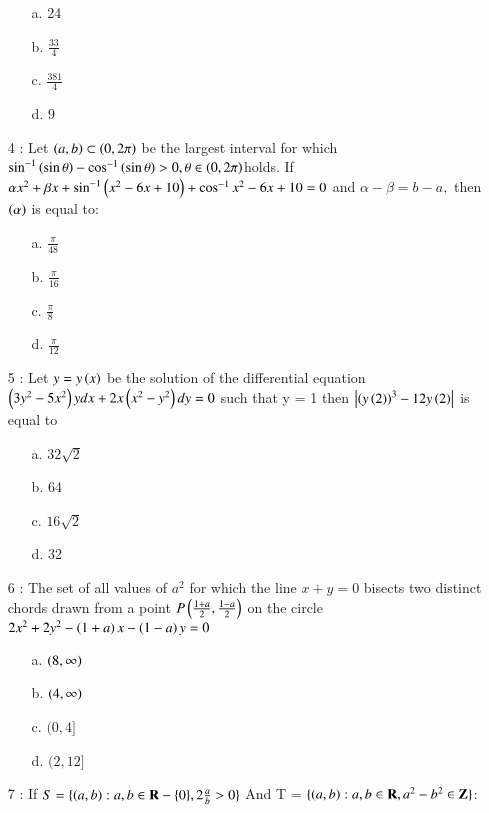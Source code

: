 \documentclass[journal]{IEEEtran}
\begin{document}
\begin{enumerate}
\begin{enumerate}
    \item [a.] 24
    \item [b.] $\frac{33}{4}$
    \item [c.] $\frac{381}{4}$
    \item [d.] 9
\end{enumerate}
\item[4]: Let $\left(a, b\right) \subset \left( 0, 2\pi\right)$ be the largest interval for which$\sin ^{-1}\left(\sin \theta\right) - \cos^{-1}\left(\sin\theta\right) > 0,  \theta \in \left( 0, 2\pi\right)$holds. If$\alpha x^2 + \beta x+ \sin^{-1}\left(x^2 - 6x + 10\right)+\cos ^{-1}{x^2 - 6x + 10} = 0$ and $\alpha - \beta = b - a,$ then $\left(\alpha\right)$ is equal to:

 \begin{enumerate}
    \item [a.] $\frac{\pi}{48}$
    \item [b.] $\frac{\pi}{16}$
    \item [c.] $\frac{\pi}{8}$
    \item [d.] $\frac{\pi}{12}$
\end{enumerate}
\item[5]: Let $y=y\left(x\right)$ be the solution of the differential equation $\left(3y^2-5x^2\right)ydx+2x\left(x^2-y^2\right)dy=0$ such that y = 1 then $\left\vert\left(y\left(2\right)\right)^3-12y\left(2\right)\right\vert$ is equal to 
\begin{enumerate}
    \item [a.] $32\sqrt{2}$
    \item [b.] 64
    \item [c.] $16\sqrt{2}$
    \item [d.] 32
\end{enumerate}
\item[6]: The set of all values of $a^2$ for which the line $x+y=0$ bisects two distinct chords drawn from a point $P\left(\frac{1+a}{2}, \frac{1-a}{2}\right)$ on the circle $2x^2 + 2y^2-\left(1+a\right)x-\left(1-a\right)y=0$
\begin{enumerate}
\item [a.] $\left(8,\infty\right)$
    \item [b.] $\left(4,\infty\right)$
    \item [c.] $(0,4]$
    \item [d.] $(2,12]$
\end{enumerate}
\item[7]: If $S = \{\left(a,b\right):a,b \in \mathbf{R}-\{0\},2\frac{a}{b}>0\}$ And T = $\{\left(a,b\right):a,b \in \mathbf{R}, a^2-b^2 \in \mathbf{Z}\}$:

\end{enumerate}
\end{document}
